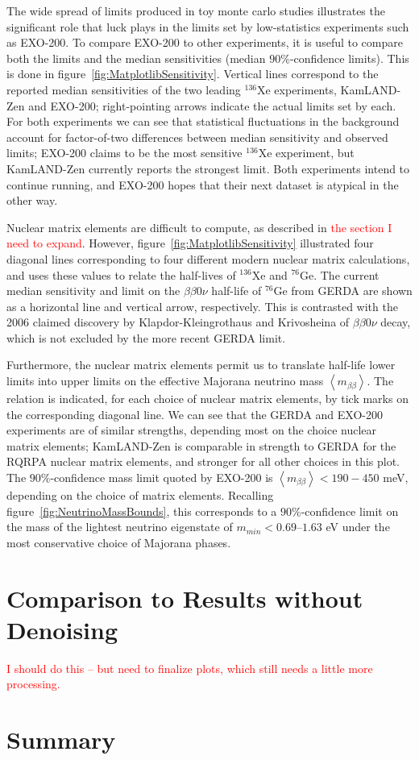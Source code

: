 The wide spread of limits produced in toy monte carlo studies illustrates the significant role that luck plays in the limits set by low-statistics experiments such as EXO-200.  To compare EXO-200 to other experiments, it is useful to compare both the limits and the median sensitivities (median $90\%$-confidence limits).  This is done in figure~\ref{fig:MatplotlibSensitivity}.  Vertical lines correspond to the reported median sensitivities of the two leading $^{136}$Xe experiments, KamLAND-Zen and EXO-200; right-pointing arrows indicate the actual limits set by each.  For both experiments we can see that statistical fluctuations in the background account for factor-of-two differences between median sensitivity and observed limits; EXO-200 claims to be the most sensitive $^{136}$Xe experiment, but KamLAND-Zen currently reports the strongest limit.  Both experiments intend to continue running, and EXO-200 hopes that their next dataset is atypical in the other way.

Nuclear matrix elements are difficult to compute, as described in \textcolor{red}{the section I need to expand}.  However, figure~\ref{fig:MatplotlibSensitivity} illustrated four diagonal lines corresponding to four different modern nuclear matrix calculations, and uses these values to relate the half-lives of $^{136}$Xe and $^{76}$Ge.  The current median sensitivity and limit on the $\beta\beta 0\nu$ half-life of $^{76}$Ge from GERDA are shown as a horizontal line and vertical arrow, respectively.  This is contrasted with the 2006 claimed discovery by Klapdor-Kleingrothaus and Krivosheina of $\beta\beta 0\nu$ decay, which is not excluded by the more recent GERDA limit.

Furthermore, the nuclear matrix elements permit us to translate half-life lower limits into upper limits on the effective Majorana neutrino mass $\left<m_{\beta\beta}\right>$.  The relation is indicated, for each choice of nuclear matrix elements, by tick marks on the corresponding diagonal line.  We can see that the GERDA and EXO-200 experiments are of similar strengths, depending most on the choice nuclear matrix elements; KamLAND-Zen is comparable in strength to GERDA for the RQRPA nuclear matrix elements, and stronger for all other choices in this plot.  The $90\%$-confidence mass limit quoted by EXO-200 is $\left<m_{\beta\beta}\right> < 190-450$ meV, depending on the choice of matrix elements.  Recalling figure~\ref{fig:NeutrinoMassBounds}, this corresponds to a $90\%$-confidence limit on the mass of the lightest neutrino eigenstate of $m_{min} < 0.69–1.63$ eV under the most conservative choice of Majorana phases.~\cite{NewEXObb0nPaper_2014}

\section{Comparison to Results without Denoising}\label{sec:ResultComparison}

\textcolor{red}{I should do this -- but need to finalize plots, which still needs a little more processing.}

\section{Summary}\label{sec:ResultSummary}

